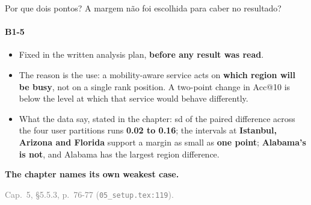 \documentclass{beamer}
\begin{document}
\begin{frame}[noframenumbering]{Por que dois pontos? A margem não foi escolhida para caber no resultado?}
    \framesubtitle{B1-5}
    \hypertarget{b15}{}
    \small
    \begin{itemize}\setlength{\itemsep}{0pt}\setlength{\parskip}{0pt}
        \item Fixed in the written analysis plan, \textbf{before any result was read}.
        \item The reason is the use: a mobility-aware service acts on \textbf{which region will be busy}, not on a single rank position. A two-point change in Acc@10 is below the level at which that service would behave differently.
        \item What the data say, stated in the chapter: sd of the paired difference across the four user partitions runs \textbf{0.02 to 0.16}; the intervals at \textbf{Istanbul, Arizona and Florida} support a margin as small as \textbf{one point}; \textbf{Alabama's is not}, and Alabama has the largest region difference.
    \end{itemize}
    \textcolor{alert}{\textbf{The chapter names its own weakest case.}}
    \vfill
    {\scriptsize
    \begin{minipage}[b]{0.775\linewidth}\raggedright\textcolor{gray}{Cap.~5, §5.5.3, p.~76-77 (\texttt{05\_setup.tex:119}).}\end{minipage}\hfill
    \begin{minipage}[b]{0.20\linewidth}\raggedleft \hyperlink{b0}{}\end{minipage}}
\end{frame}
\end{document}
